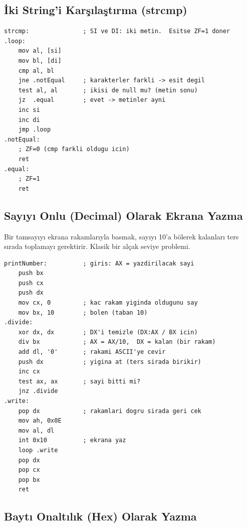 \documentclass[11pt,a4paper]{article}
\begin{document}
\subsection{İki String'i Karşılaştırma (strcmp)}

\begin{ornekkutu}
\begin{lstlisting}
strcmp:               ; SI ve DI: iki metin.  Esitse ZF=1 doner
.loop:
    mov al, [si]
    mov bl, [di]
    cmp al, bl
    jne .notEqual     ; karakterler farkli -> esit degil
    test al, al       ; ikisi de null mu? (metin sonu)
    jz  .equal        ; evet -> metinler ayni
    inc si
    inc di
    jmp .loop
.notEqual:
    ; ZF=0 (cmp farkli oldugu icin)
    ret
.equal:
    ; ZF=1
    ret
\end{lstlisting}
\end{ornekkutu}

\subsection{Sayıyı Onlu (Decimal) Olarak Ekrana Yazma}

Bir tamsayıyı ekrana rakamlarıyla basmak, sayıyı 10'a bölerek kalanları ters
sırada toplamayı gerektirir. Klasik bir alçak seviye problemi.

\begin{ornekkutu}
\begin{lstlisting}
printNumber:          ; giris: AX = yazdirilacak sayi
    push bx
    push cx
    push dx
    mov cx, 0         ; kac rakam yiginda oldugunu say
    mov bx, 10        ; bolen (taban 10)
.divide:
    xor dx, dx        ; DX'i temizle (DX:AX / BX icin)
    div bx            ; AX = AX/10,  DX = kalan (bir rakam)
    add dl, '0'       ; rakami ASCII'ye cevir
    push dx           ; yigina at (ters sirada birikir)
    inc cx
    test ax, ax       ; sayi bitti mi?
    jnz .divide
.write:
    pop dx            ; rakamlari dogru sirada geri cek
    mov ah, 0x0E
    mov al, dl
    int 0x10          ; ekrana yaz
    loop .write
    pop dx
    pop cx
    pop bx
    ret
\end{lstlisting}
\end{ornekkutu}

\subsection{Baytı Onaltılık (Hex) Olarak Yazma}
\end{document}
